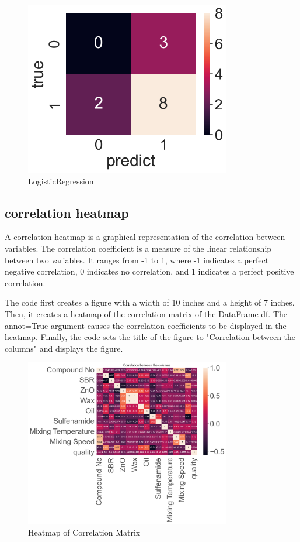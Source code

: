 \documentclass{article}
\begin{document}
\begin{figure}[h!]
  \centering
  \includegraphics[width=0.8\textwidth]{LogisticRegression.png}
  \caption{LogisticRegression}
\end{figure}

\pagebreak
\subsection{correlation heatmap}


 A correlation heatmap is a graphical representation of the correlation between variables. The correlation coefficient is a measure of the linear relationship between two variables. It ranges from -1 to 1, where -1 indicates a perfect negative correlation, 0 indicates no correlation, and 1 indicates a perfect positive correlation.

The code first creates a figure with a width of 10 inches and a height of 7 inches. Then, it creates a heatmap of the correlation matrix of the DataFrame df. The annot=True argument causes the correlation coefficients to be displayed in the heatmap. Finally, the code sets the title of the figure to "Correlation between the columns" and displays the figure.

\begin{figure}[h!]
  \centering
  \includegraphics[width=0.8\textwidth]{Heatmap of Correlation Matrix.png}
  \caption{Heatmap of Correlation Matrix}
\end{figure}
\end{document}

